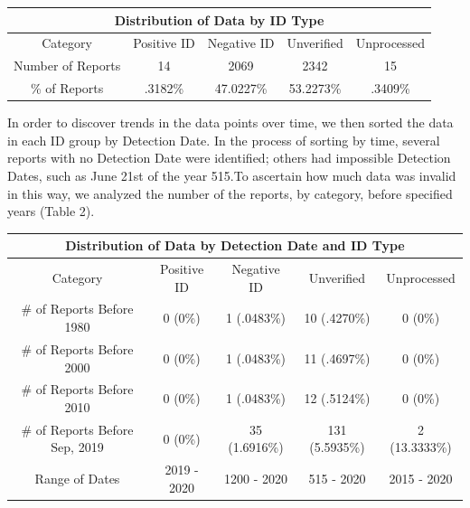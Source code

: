 \documentclass[letterpaper]{article}
\begin{document}
\begin{center}
 \label{tab:title} 
 \begin{tabular}{||c c c c c||} 
 \hline
 \multicolumn{5}{|c|}{Distribution of Data by ID Type} \\
 \hline
 Category & Positive ID & Negative ID & Unverified & Unprocessed  \\ [0.5ex] 
 \hline
 Number of Reports & 14 & 2069 & 2342 & 15 \\ 
 \hline
\% of Reports & .3182\% & 47.0227\% & 53.2273\% & .3409\% \\

 \hline
\end{tabular}

\end{center}

\begin{flushleft}
In order to discover trends in the data points over time, we then sorted the data in each ID group by Detection Date. In the process of sorting by time, several reports with no Detection Date were identified; others had impossible Detection Dates, such as June 21st of the year 515.To ascertain how much data was invalid in this way, we analyzed the number of the reports, by category, before specified years (Table 2). 
\end{flushleft}

\begin{center}
 \label{tab:title} 
 \begin{tabular}{||c c c c c||} 
 \hline
 \multicolumn{5}{|c|}{Distribution of Data by Detection Date and ID Type} \\
 \hline
 Category & Positive ID & Negative ID & Unverified & Unprocessed  \\ [0.5ex] 
 \hline
 \# of Reports Before 1980 & 0 (0\%) & 1 (.0483\%) & 10 (.4270\%) & 0 (0\%) \\ 
 \hline
\# of Reports Before 2000 & 0 (0\%) & 1 (.0483\%) & 11 (.4697\%) & 0 (0\%) \\
\hline
\# of Reports Before 2010 & 0 (0\%) & 1 (.0483\%) & 12 (.5124\%) & 0 (0\%) \\
\hline
\# of Reports Before Sep, 2019 & 0 (0\%) & 35 (1.6916\%) & 131 (5.5935\%) & 2 (13.3333\%) \\
\hline
Range of Dates & 2019 - 2020 & 1200 - 2020 & 515 - 2020 & 2015 - 2020 \\
\hline
\end{tabular}
\end{center}
\end{document}
